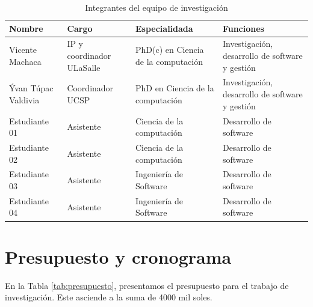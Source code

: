 \documentclass[a4paper]{article}
\begin{document}
\begin{table}[H]
\caption{Integrantes del equipo de investigación}
\label{tab:integrantes}
\setlength{\tabcolsep}{0.5em} %
{\renewcommand{\arraystretch}{1.4}%
\begin{tabular}{|p{3cm}p{2.5cm}p{3.5cm}p{4.8cm}|}  \hline
\textbf{Nombre} & \textbf{Cargo}          & \textbf{Especialidada} & \textbf{Funciones} \\ \hline
Vicente Machaca      & IP y coordinador ULaSalle   & PhD(c) en Ciencia de la computación & Investigación, desarrollo de software y gestión      \\
Ývan Túpac Valdivia   & Coordinador   UCSP           & PhD en Ciencia de la computación   & Investigación, desarrollo de software y gestión \\
Estudiante 01               & Asistente         &    Ciencia de la computación           & Desarrollo   de software                      \\
Estudiante 02               & Asistente           &    Ciencia de la computación      & Desarrollo  de software        \\    

Estudiante 03               & Asistente         &      Ingeniería de Software         & Desarrollo de software                        \\
Estudiante 04               & Asistente           &   Ingeniería de Software       & Desarrollo de software         \\  \hline              
\end{tabular}

}
\end{table}


\section{Presupuesto y cronograma}

En la Tabla \ref{tab:presupuesto}, presentamos el presupuesto para el trabajo de investigación. Este asciende a la suma de 4000 mil soles.
\end{document}

